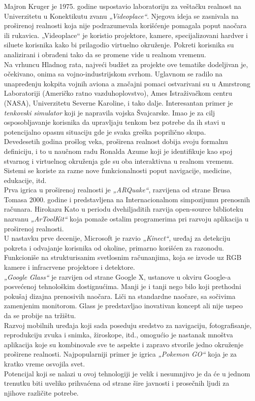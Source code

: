 \documentclass[a4paper]{article}
\begin{document}
	Majron Kruger je 1975. godine uspostavio laboratoriju za veštačku realnost na Univerzitetu u Konektikutu zvanu \emph{„Videoplace“}. 
	Njegova ideja se zasnivala na proširenoj realnosti koja nije podrazumevala korišćenje pomagala poput naočara ili rukavica. „Videoplace“ je koristio projektore, kamere, 
	specijalizovani hardver i siluete korisnika kako bi prilagodio virtuelno okruženje. Pokreti korisnika su analizirani i obrađeni tako da se promene vide u realnom vremenu.\\
    Na vrhuncu Hladnog rata, najveći budžet za projekte ove tematike dodeljivan je, očekivano, onima sa vojno-industrijskom svrhom. Uglavnom se radilo na unapređenju kokpita 
	vojnih aviona a značajni pomaci ostvarivani su u Amrstrong Laboratoriji (Američko ratno vazduhoplovstvo), Ames Istraživačkom centru (NASA), Univerzitetu Severne Karoline, i tako dalje. 
	Interesantan primer je \emph{tenkovski simulator} koji je napravila vojska Švajcarske. Imao je za cilj osposobljavanje korisnika da upravljaju tenkom bez potrebe
	 da ih stavi u potencijalno opasnu situaciju gde je svaka greška poprilično skupa.\\
    Devedesetih godina prošlog veka, proširena realnost dobija svoju formalnu definiciju, i to u naučnom radu Ronalda Azume koji je identifikuje kao spoj stvarnog i virtuelnog okruženja
	 gde su oba interaktivna u realnom vremenu. Sistemi se koriste za razne nove funkcionalnosti poput navigacije, medicine, edukacije, itd.\\
    Prva igrica u proširenoj realnosti je \emph{„ARQuake“}, razvijena od strane Brusa Tomasa 2000. godine i predstavljena na Internacionalnom simpozijumu prenosnih računara.
	 Hirokazu Kato u periodu dvehiljaditih razvija open-source biblioteku nazvanu \emph{„ArToolKit“} koja pomaže ostalim programerima pri razvoju aplikacija u proširenoj realnosti.\\ 
    U nastavku prve decenije, Microsoft je razvio \emph{„Kinect“}, uređaj za detekciju pokreta i odvajanje korisnika od okoline, primarno korišćen za razonodu. 
	Funkcioniše na strukturisanim svetlosnim računanjima, koja se izvode uz RGB kamere i infracrvene projektore i detektore.\\
    \emph{„Google Glass“} je razvijen od strane Google X, ustanove u okviru Google-a posvećenoj tehnološkim dostignućima. Manji je i tanji nego bilo koji prethodni pokušaj
	 dizajna prenosivih naočara. Liči na standardne naočare, sa sočivima zamenjenim monitorom. Glass je predstavljao inovativan koncept ali nije uspeo da se probije na tržištu.\\
    Razvoj mobilnih uređaja koji sada poseduju sredstvo za navigaciju, fotografisanje, reprodukciju zvuka i snimka, žiroskope, itd., omogućio je nastanak mnoštva aplikacija
	 koje su kombinovale sve te aspekte i zapravo stvorile jedno okruženje proširene realnosti. Najpopularniji primer je igrica \emph{„Pokemon GO“ }koja je za kratko vreme osvojila svet.\\ 
    Potencijal koji se nalazi u ovoj tehnologiji je velik i nesumnjivo je da će u jednom trenutku biti uveliko prihvaćena od strane šire javnosti i prosečnih ljudi za njihove 
	različite potrebe.
	
\end{document}
